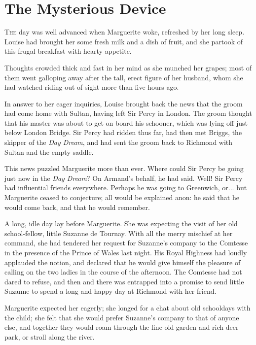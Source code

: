 
\chapter{The Mysterious Device}

\lettrine[lines=4]{T}{he} day was well advanced when Marguerite woke, refreshed by her long sleep. Louise had brought her some fresh milk and a dish of fruit, and she partook of this frugal breakfast with hearty appetite.

Thoughts crowded thick and fast in her mind as she munched her grapes; most of them went galloping away after the tall, erect figure of her husband, whom she had watched riding out of sight more than five hours ago.

In answer to her eager inquiries, Louise brought back the news that the groom had come home with Sultan, having left Sir Percy in London. The groom thought that his master was about to get on board his schooner, which was lying off just below London Bridge. Sir Percy had ridden thus far, had then met Briggs, the skipper of the \textit{Day Dream}, and had sent the groom back to Richmond with Sultan and the empty saddle.

This news puzzled Marguerite more than ever. Where could Sir Percy be going just now in the \textit{Day Dream}? On Armand's behalf, he had said. Well! Sir Percy had influential friends everywhere. Perhaps he was going to Greenwich, or... but Marguerite ceased to conjecture; all would be explained anon: he said that he would come back, and that he would remember.

A long, idle day lay before Marguerite. She was expecting the visit of her old school-fellow, little Suzanne de Tournay. With all the merry mischief at her command, she had tendered her request for Suzanne's company to the Comtesse in the presence of the Prince of Wales last night. His Royal Highness had loudly applauded the notion, and declared that he would give himself the pleasure of calling on the two ladies in the course of the afternoon. The Comtesse had not dared to refuse, and then and there was entrapped into a promise to send little Suzanne to spend a long and happy day at Richmond with her friend.

Marguerite expected her eagerly; she longed for a chat about old schooldays with the child; she felt that she would prefer Suzanne's company to that of anyone else, and together they would roam through the fine old garden and rich deer park, or stroll along the river.

